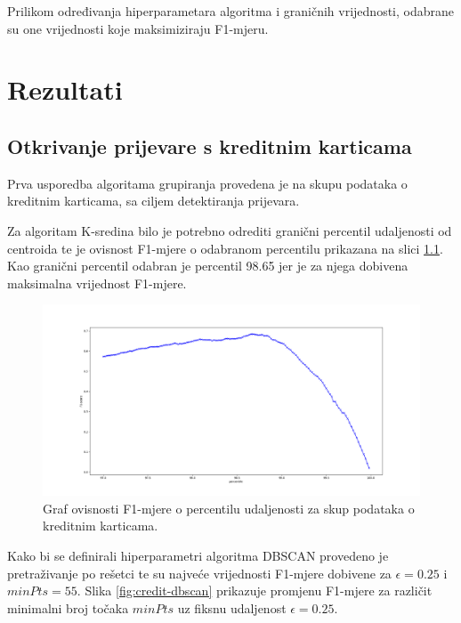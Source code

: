 \documentclass[utf8, diplomski, numeric]{fer}
\begin{document}
Prilikom određivanja hiperparametara algoritma i graničnih vrijednosti, odabrane su one vrijednosti koje maksimiziraju F1-mjeru.

\chapter{Rezultati}

\section{Otkrivanje prijevare s kreditnim karticama}
Prva usporedba algoritama grupiranja provedena je na skupu podataka o kreditnim karticama, sa ciljem detektiranja prijevara.

Za algoritam K-sredina bilo je potrebno odrediti granični percentil udaljenosti od centroida te je ovisnost F1-mjere o odabranom percentilu prikazana na slici \ref{fig:credit-kmeans}. Kao granični percentil odabran je percentil 98.65 jer je za njega dobivena maksimalna vrijednost F1-mjere.

\begin{figure}[htb]
\includegraphics[width=1\textwidth]{images/credit-kmeans-f1.png}
\centering
\caption{Graf ovisnosti F1-mjere o percentilu udaljenosti za skup podataka o kreditnim karticama.}
\label{fig:credit-kmeans}
\end{figure}

Kako bi se definirali hiperparametri algoritma DBSCAN provedeno je pretraživanje po rešetci te su najveće vrijednosti F1-mjere dobivene za $\epsilon = 0.25$ i $minPts = 55$. Slika \ref{fig:credit-dbscan} prikazuje promjenu F1-mjere za različit minimalni broj točaka $minPts$ uz fiksnu udaljenost $\epsilon = 0.25$.
\end{document}
